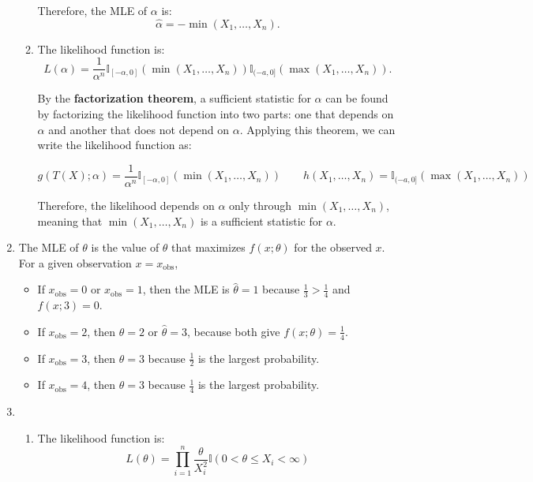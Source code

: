 \documentclass{article}
\begin{document}
\begin{enumerate}
\begin{enumerate}[label=(\roman*)]
    Therefore, the MLE of $\alpha$ is:
    \[
    \hat{\alpha} = -\min(X_1, \dots, X_n).
    \]

    \item The likelihood function is:
    \[
    L(\alpha) = \frac{1}{\alpha^n} \mathbb{I}_{[-\alpha, 0]}(\min(X_1, \dots, X_n)) \mathbb{I}_{(-a, 0]}(\max(X_1, \dots, X_n)).
    \]

    By the \textbf{factorization theorem}, a sufficient statistic for \(\alpha\) can be found by factorizing the likelihood function into two parts: one that depends on \(\alpha\) and another that does not depend on \(\alpha\). Applying this theorem, we can write the likelihood function as:

    \[
    g(T(X); \alpha) = \frac{1}{\alpha^n} \mathbb{I}_{[-\alpha, 0]}(\min(X_1, \dots, X_n)) \quad \quad
    h(X_1, \dots, X_n) = \mathbb{I}_{(-a, 0]}(\max(X_1, \dots, X_n))
    \]

    Therefore, the likelihood depends on \(\alpha\) only through \( \min(X_1, \dots, X_n) \), \\
    meaning that \( \min(X_1, \dots, X_n) \) is a sufficient statistic for \(\alpha\).
    \end{enumerate}

\item
The MLE of $\theta$ is the value of $\theta$ that maximizes $f(x; \theta)$ for the observed $x$. For a given observation $x = x_{\text{obs}}$,

\begin{itemize}
    \item If $x_{\text{obs}} = 0$ or $x_{\text{obs}} = 1$, then the MLE is $\hat{\theta} = 1$ because $\frac{1}{3} > \frac{1}{4}$ and $f(x; 3) = 0$.
    \item If $x_{\text{obs}} = 2$, then $\hat{\theta} = 2$ or $\hat{\theta} = 3$, because both give $f(x; \theta) = \frac{1}{4}$.
    \item If $x_{\text{obs}} = 3$, then $\hat{\theta} = 3$ because $\frac{1}{2}$ is the largest probability.
    \item If $x_{\text{obs}} = 4$, then $\hat{\theta} = 3$ because $\frac{1}{4}$ is the largest probability.
\end{itemize}

\item
    \begin{enumerate}[label=(\roman*)]
    \item The likelihood function is:
    \[
    L(\theta) = \prod_{i=1}^{n} \frac{\theta}{X_i^2} \mathbb{I} (0 < \theta \leq X_i < \infty)
    \]


\end{enumerate}
\end{enumerate}
\end{document}
